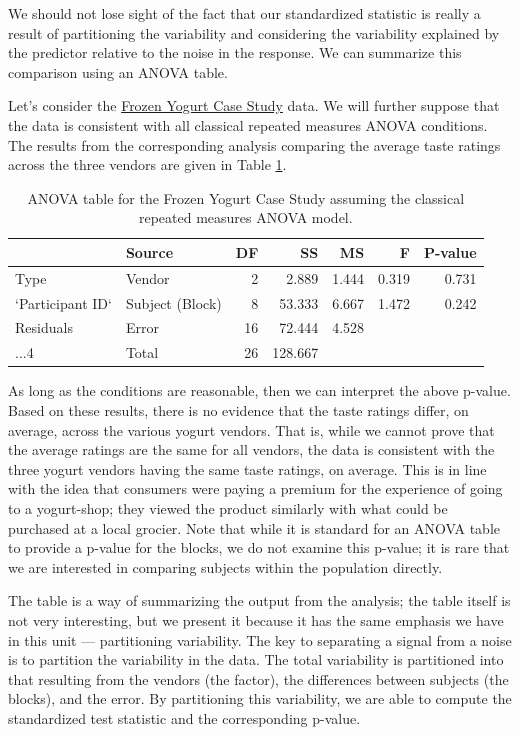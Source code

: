 \documentclass[
]{book}
\theoremstyle{plain}
\theoremstyle{mydefn}
\theoremstyle{myexmpl}
\theoremstyle{remark}
\begin{document}
We should not lose sight of the fact that our standardized statistic is really a result of partitioning the variability and considering the variability explained by the predictor relative to the noise in the response. We can summarize this comparison using an ANOVA table.

Let's consider the \protect\hyperlink{CaseYogurt}{Frozen Yogurt Case Study} data. We will further suppose that the data is consistent with all classical repeated measures ANOVA conditions. The results from the corresponding analysis comparing the average taste ratings across the three vendors are given in Table \ref{tab:blockteststat-yogurt-anova-table}.

\begin{table}

\caption{\label{tab:blockteststat-yogurt-anova-table}ANOVA table for the Frozen Yogurt Case Study assuming the classical repeated measures ANOVA model.}
\centering
\begin{tabular}[t]{l|l|r|r|r|r|r}
\hline
  & Source & DF & SS & MS & F & P-value\\
\hline
Type & Vendor & 2 & 2.889 & 1.444 & 0.319 & 0.731\\
\hline
`Participant ID` & Subject (Block) & 8 & 53.333 & 6.667 & 1.472 & 0.242\\
\hline
Residuals & Error & 16 & 72.444 & 4.528 &  & \\
\hline
...4 & Total & 26 & 128.667 &  &  & \\
\hline
\end{tabular}
\end{table}

As long as the conditions are reasonable, then we can interpret the above p-value. Based on these results, there is no evidence that the taste ratings differ, on average, across the various yogurt vendors. That is, while we cannot prove that the average ratings are the same for all vendors, the data is consistent with the three yogurt vendors having the same taste ratings, on average. This is in line with the idea that consumers were paying a premium for the experience of going to a yogurt-shop; they viewed the product similarly with what could be purchased at a local grocier. Note that while it is standard for an ANOVA table to provide a p-value for the blocks, we do not examine this p-value; it is rare that we are interested in comparing subjects within the population directly.

The table is a way of summarizing the output from the analysis; the table itself is not very interesting, but we present it because it has the same emphasis we have in this unit --- partitioning variability. The key to separating a signal from a noise is to partition the variability in the data. The total variability is partitioned into that resulting from the vendors (the factor), the differences between subjects (the blocks), and the error. By partitioning this variability, we are able to compute the standardized test statistic and the corresponding p-value.
\end{document}
